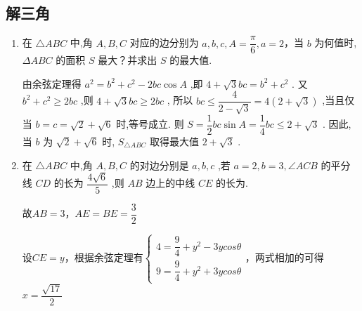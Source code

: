 \subsection*{解三角}
\begin{enumerate}
    \item 在 $\bigtriangleup  {ABC}$ 中,角 $A,B,C$ 对应的边分别为 $a,b,c,A = \dfrac{\pi }{6},a = 2$，当 $b$ 为何值时, ${\Delta ABC}$ 的面积 $S$ 最大？并求出 $S$ 的最大值.
    \begin{jieda}
        由余弦定理得 ${a^2} = {b}^{2} + {c}^{2} - {2bc}\cos A$ ,即 $4 + \sqrt{3}{bc} = {b}^{2} + {c}^{2}$ .
        又 ${b}^{2} + {c}^{2} \geq  {2bc}$ ,则 $4 + \sqrt{3}{bc} \geq  {2bc}$ ,
        所以 ${bc} \leq  \dfrac{4}{2 - \sqrt{3}} = 4\left( {2 + \sqrt{3}}\right)$ ,当且仅当 $b = c = \sqrt{2} + \sqrt{6}$ 时,等号成立.
        则 $S = \dfrac{1}{2}{bc}\sin A = \dfrac{1}{4}{bc} \leq  2 + \sqrt{3}$ .
        因此,当 $b$ 为 $\sqrt{2} + \sqrt{6}$ 时, ${S}_{\bigtriangleup {ABC}}$ 取得最大值 $2 + \sqrt{3}$ .
    \end{jieda}


    \item 在 $\bigtriangleup {ABC}$ 中,角 $A,B,C$ 的对边分别是 $a,b,c$ ,若 $a = 2,b = 3,\angle {ACB}$ 的平分线 ${CD}$ 的长为 $\dfrac{4\sqrt{6}}{5}$ ,则 ${AB}$ 边上的中线 ${CE}$ 的长为.
    \begin{jieda}
        故$AB = 3$，$AE = BE = \dfrac{3}{2}$

        设$CE = y$，根据余弦定理有$\left\{\begin{array}{l}
                4 = \dfrac{9}{4} + y^2 - 3ycos\theta  \\
                9 = \dfrac{9}{4} + y^2 + 3ycos\theta
        \end{array}\right.$，两式相加的可得$x = \dfrac{\sqrt{17}}{2}$
    \end{jieda}


\end{enumerate}
